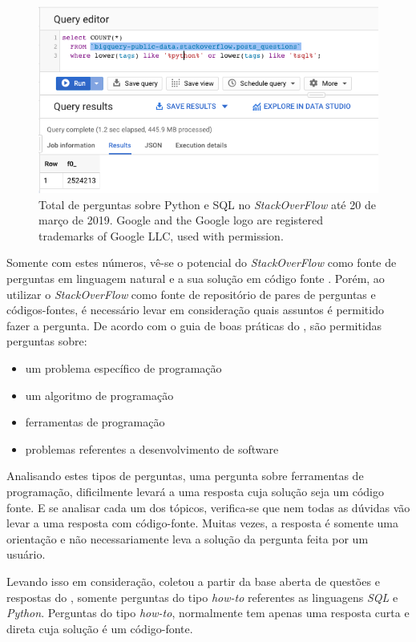 \begin{figure}[h]
\includegraphics[width=12cm]{src/figuras/cap-problema/post-questions-python-sql-total.png}
\caption{Total de perguntas sobre Python e SQL no \textit{StackOverFlow} até 20 de março de 2019. Google and the Google logo are registered trademarks of Google LLC, used with permission.}
\label{fig:bigquery-total-questions-python-sql-stackoverflow}
\end{figure}

Somente com estes números, vê-se o potencial do \textit{StackOverFlow} como fonte de perguntas em linguagem natural e a sua solução em código fonte \cite{yao-2018}. Porém, ao utilizar o \textit{StackOverFlow} como fonte de repositório de pares de perguntas e códigos-fontes, é necessário levar em consideração quais assuntos é permitido fazer a pergunta. De acordo com o guia de boas práticas do \cite{stackoverflow-questions-topics-2019}, são permitidas perguntas sobre:

\begin{itemize}
    \item um problema específico de programação
    \item um algoritmo de programação
    \item ferramentas de programação
    \item problemas referentes a desenvolvimento de software
\end{itemize}

Analisando estes tipos de perguntas, uma pergunta sobre ferramentas de programação, dificilmente levará a uma resposta cuja solução seja um código fonte. E se analisar cada um dos tópicos, verifica-se que nem todas as dúvidas vão levar a uma resposta com código-fonte. Muitas vezes, a resposta é somente uma orientação e não necessariamente leva a solução da pergunta feita por um usuário.

Levando isso em consideração, \citeauthor{yao-2018} coletou a partir da base aberta de questões e respostas do \cite{stackoverflow-questions-topics-2019}, somente perguntas do tipo \textit{how-to} referentes as linguagens \textit{SQL} e \textit{Python}. Perguntas do tipo \textit{how-to}, normalmente tem apenas uma resposta curta e direta cuja solução é um código-fonte. 

